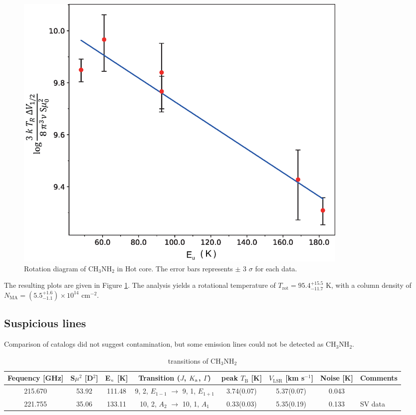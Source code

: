 \begin{figure}[H]
  \centering
  \includegraphics[width=0.8\textwidth]{OrionKL/RD_6point_label.eps}
  \caption{Rotation diagram of CH$_{3}$NH$_{2}$ in Hot core. The error bars represents $\pm$ 3 $\sigma$ for each data.}
  \label{fig:RD}
\end{figure}

The resulting plots are given in Figure \ref{fig:RD}.
The analysis yields a rotational temperature of $T_{\mathrm{rot}} =  95.4^{+15.5}_{-11.7} \,\,\mathrm{K}$, 
with a column density of $N_{\mathrm{MA}} = ( 5.5^{+1.6}_{-1.1} ) \times 10^{14} \,\,\mathrm{cm^{-2}}$.

\subsection{Suspicious lines}
Comparison of catalogs did not suggest contamination, but some emission lines could not be detected as CH$_{3}$NH$_{2}$.

\renewcommand{\arraystretch}{1.5}
\begin{table}[htb]
\begin{center}

  \caption{transitions of CH$_3$NH$_2$}
  \label{tab:unresolved}
{\scriptsize
  \begin{tabular}{cccccccl} \hline
   Fequency [GHz]& S$\mu ^{2}$ [D$^2$] & E$_{\rm{u}}$ [K]& Transition ($J$, $K_{\rm{a}}$, $\Gamma$) 
   & peak $T_{\mathrm{B}}$ [K] & $V_{\mathrm{LSR}}$ [km s$^{-1}$] & Noise [K]  &Comments \\ \hline 
    215.670 & 53.92 & 111.48 & 9, 2, $E_{1-1}$ $\rightarrow$ 9, 1, $E_{1+1}$  & 3.74(0.07) & 5.37(0.07) & 0.043 &  \\
    221.755 & 35.06 & 133.11 & 10, 2, $A_{2}$ $\rightarrow$ 10, 1, $A_{1}$ & 0.33(0.03)& 5.35(0.19) & 0.133 &SV data \\ \hline
  \end{tabular}
  }
\end{center}
\end{table}

